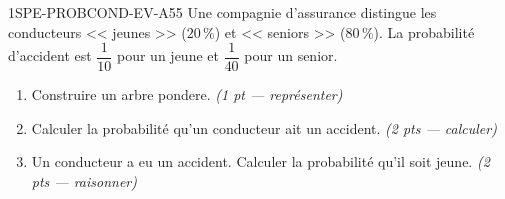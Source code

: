 \begin{evaluation}{1SPE-PROBCOND-EV-A}{55}
\medskip
Une compagnie d'assurance distingue les conducteurs << jeunes >> ($20\,\%$) et << seniors >> ($80\,\%$). La probabilité d'accident est $\dfrac{1}{10}$ pour un jeune et $\dfrac{1}{40}$ pour un senior.

\begin{enumerate}
  \item Construire un arbre pondere.
  \hfill\textit{(1 pt --- représenter)}

  \item Calculer la probabilité qu'un conducteur ait un accident.
  \hfill\textit{(2 pts --- calculer)}

  \item Un conducteur a eu un accident. Calculer la probabilité qu'il soit jeune.
  \hfill\textit{(2 pts --- raisonner)}
\end{enumerate}

\end{evaluation}
